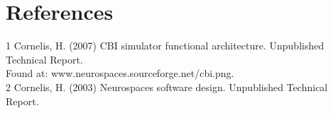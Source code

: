 \documentclass[12pt]{article}
\begin{document}

\section{References}
1 Cornelis, H. (2007) CBI simulator functional architecture. Unpublished Technical Report.\\
\hspace*{1cm} Found at: www.neurospaces.sourceforge.net/cbi.png.\\
2 Cornelis, H. (2003) Neurospaces software design. Unpublished Technical Report.



\end{document}
